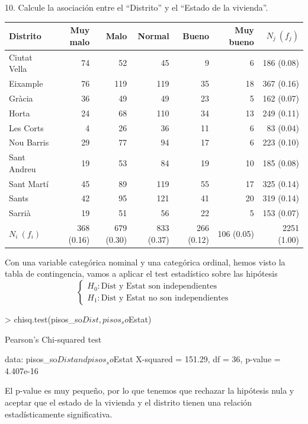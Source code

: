 \documentclass[11pt,a4paper]{article}
\begin{document}
\newpage

\begin{tcolorbox}[colback=gray!20,colframe=gray!20, sharp corners]
10. Calcule la asociación entre el “Distrito” y el “Estado de la vivienda”.
\end{tcolorbox}


\begin{table}[h]
    \centering
    \small
    \begin{tabular}{lrrrrrr}
        
        Distrito & Muy malo & Malo & Normal & Bueno & Muy bueno & $N_j\ (f_j)$ \\
        \midrule
        Ciutat Vella & 74 & 52 & 45 & 9 & 6 & 186 (0.08) \\
        Eixample & 76 & 119 & 119 & 35 & 18 & 367 (0.16) \\
        Gràcia & 36 & 49 & 49 & 23 & 5 & 162 (0.07) \\
        Horta & 24 & 68 & 110 & 34 & 13 & 249 (0.11) \\
        Les Corts & 4 & 26 & 36 & 11 & 6 & 83 (0.04) \\
        Nou Barris & 29 & 77 & 94 & 17 & 6 & 223 (0.10) \\
        Sant Andreu & 19 & 53 & 84 & 19 & 10 & 185 (0.08) \\
        Sant Martí & 45 & 89 & 119 & 55 & 17 & 325 (0.14) \\
        Sants & 42 & 95 & 121 & 41 & 20 & 319 (0.14) \\
        Sarrià & 19 & 51 & 56 & 22 & 5 & 153 (0.07) \\
        \midrule
        $N_i\ (f_i)$ & 368 (0.16) & 679 (0.30) & 833 (0.37) & 266 (0.12) & 106 (0.05) & 2251 (1.00) \\
        
    \end{tabular}
\end{table}

Con una variable categórica nominal y una categórica ordinal, hemos visto la tabla de contingencia, vamos a aplicar el test estadístico sobre las hipótesis
\begin{equation*}
    \begin{cases}
        H_0 : \text{Dist y Estat son independientes} \\
        H_1 : \text{Dist y Estat no son independientes}
    \end{cases}
\end{equation*}
\begin{rcode}
 > chisq.test(pisos_so$Dist, pisos_so$Estat)

        Pearson's Chi-squared test

data:  pisos_so$Dist and pisos_so$Estat
X-squared = 151.29, df = 36, p-value = 4.407e-16
\end{rcode}

El p-value es muy pequeño, por lo que tenemos que rechazar la hipótesis nula y aceptar que el estado de la vivienda y el distrito tienen una relación estadísticamente significativa.
\end{document}
